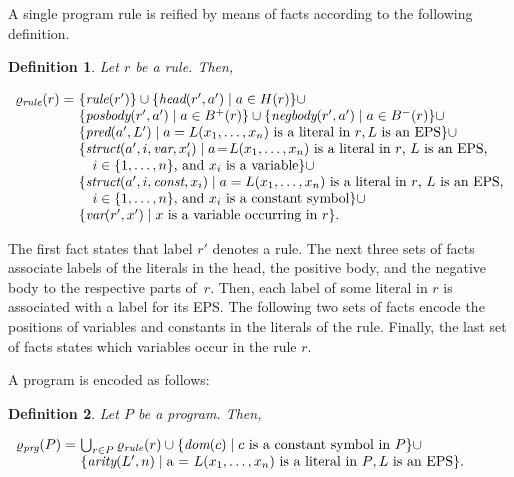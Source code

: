 \documentclass{tlp}
\newcommand{\constant}[1]{\ensuremath{\mathit{#1}}}
\newcommand{\posbody}{B^{+}}
\newcommand{\negbody}{B^{-}}
\newcommand{\head}{H}
\renewcommand{\mathit}[1]{{\text{\it{#1}}}}
\newtheorem{definition}{Definition}
\begin{document}
A single program rule  is reified by means of facts according to the following definition.
\begin{definition}
Let  $r$ be a rule. Then,
\begin{center}

$\begin{array}{r@{}l}
\reifrule{r} =\ & \{ \mathit{rule}(r') \} \cup  \{ \mathit{head}(r', a') \mid a \in \head(r) \} \cup \\
&  \{ \mathit{posbody}(r', a') \mid a \in \posbody(r) \} \cup 
     \{ \mathit{negbody}(r', a') \mid a \in \negbody(r) \} \cup \\
 &   \{ \mathit{pred}(a',L') \mid \mbox{$a = L(x_{1},\ldots,x_{n})$} \mbox{ is a literal in $r$},  
    \mbox{$L$ is an EPS}\} \cup \\
 &  \{ \mathit{struct}(a',i,\constant{var},x_{i}') \mid \mbox{$a\!=\!L(x_{1},\ldots, x_{n})$}   \mbox{ is a literal in $r$,} 
     \mbox{ $L$ is an EPS,}\\  
  &  \hspace{1em} \mbox{$i \in \{1, \ldots, n\}$, and $x_{i}$ is a variable}  \} \cup \\ 
 & \{ \mathit{struct}(a',i,\constant{const},x_{i}) \mid   \mbox{$a = L(x_{1},\ldots, x_{n})$}  \mbox{ is a literal}    
\mbox{ in $r$, $L$ is an EPS,}\\
  &\hspace{1em} \mbox{$i \in \{1, \ldots, n\}$, and $x_{i}$ is a constant symbol}  \} \cup \\
 & \{ \mathit{var}(r',x') \mid \mbox{$x$ is a variable occurring in $r$} \}\mbox{.}
\end{array}$
\end{center}
\end{definition}
The first fact states that label $r'$ denotes a rule.
The next three sets of facts associate labels of the literals in the head, the positive body, and the negative body
to the respective parts of~$r$.
Then, each label of some literal in $r$ is associated with a label for its  EPS.
The following two sets of facts encode the positions of variables and constants in the literals of the rule.
Finally, the last set of facts states which variables occur in the rule $r$.



A program is encoded as follows:
\begin{definition}
Let $P$ be a program. Then, 
\begin{center}
$\begin{array}{r@{}l}
\reifprg{P} =\ &
\bigcup_{r \in P} \reifrule{r} \cup 
\{ \mathit{dom}(c) \mid \mbox{$c$ is  a constant  symbol in $P$} \} \cup \\
& \{ \mathit{arity}(L',n) \mid \mbox{a = $L(x_1, \ldots, x_n)$ is a literal in $P$}, 
\mbox{$L$ is an EPS}  \}\mbox{.}
\end{array}$
\end{center}
\end{definition}
\end{document}

